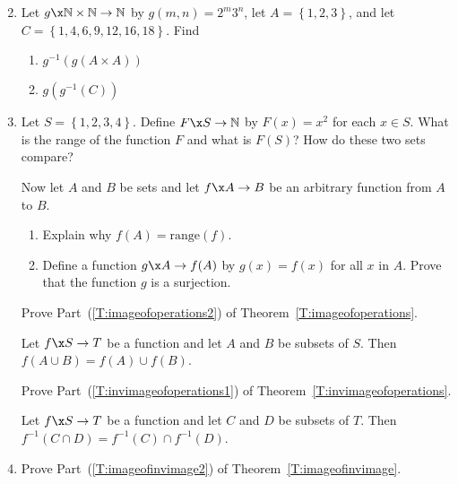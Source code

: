 \begin{enumerate}
\begin{multicols}{2}
\begin{enumerate}
\end{enumerate}
\end{multicols}

\item Let $g\x \mathbb{N} \times \mathbb{N} \to \mathbb{N}$ by $g ( m, n ) = 2^m 3^n$, let $A = \left\{ 1, 2, 3 \right\}$, and let $C = \left\{ 1, 4, 6, 9, 12, 16, 18 \right\}$.  Find \label{exer:sec91-3}
\begin{multicols}{2}
\begin{enumerate}
\yitem $g ( A \times A )$
\yitem $g^{-1} ( C )$
\item $g^{-1} \!\left( g ( A \times A ) \right)$
\item $g \!\left( g^{-1} ( C ) \right)$
\end{enumerate}
\end{multicols}

\item \begin{enumerate}
\yitem Let $S = \left\{1, 2, 3, 4 \right\}$.  Define $F\x S \to \mathbb{N}$ by 
$F ( x ) = x^2$ for each $x \in S$.  What is the range of the function $F$ and what is $F ( S )$?  How do these two sets compare?
\end{enumerate} \label{exer:sec91-4}
Now let $A$ and $B$ be sets and let $f\x A \to B$ be an arbitrary function from $A$ to $B$.
\begin{enumerate} \addtocounter{enumii}{1}
\item Explain why $f ( A ) = \text{range} ( f )$.

\item Define a function $g\x A \to f ( A )$ by 
$g ( x  ) = f ( x )$ for all $x$ in $A$.  Prove that the function $g$ is a surjection.
\end{enumerate}

\xitem Prove Part~(\ref{T:imageofoperations2}) of Theorem~\ref{T:imageofoperations}.
\label{exer:sec91-5}

Let $f\x S \to T$ be a function and let $A$ and $B$ be subsets of $S$.  Then 
$f ( A \cup B ) = f ( A ) \cup f ( B )$.

\xitem Prove Part~(\ref{T:invimageofoperations1}) of Theorem~\ref{T:invimageofoperations}.
\label{exer:sec91-6}

Let $f\x S \to T$ be a function and let $C$ and $D$ be subsets of $T$.  Then
$f^{-1} ( C \cap D ) = f^{-1} ( C ) \cap f^{-1} ( D )$.

\item Prove Part~(\ref{T:imageofinvimage2}) of Theorem~\ref{T:imageofinvimage}.
\label{exer:sec91-7}


\end{enumerate}
